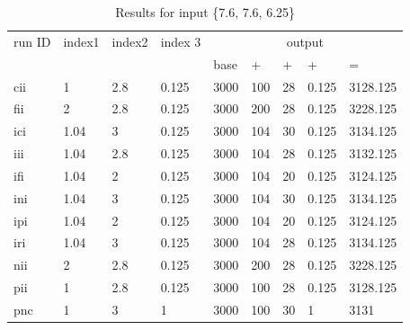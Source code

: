 \documentclass[11pt,fleqn]{report}
\begin{document}
\begin{table}[H]
\caption{Results for input \{7.6, 7.6, 6.25\}}
\begin{center}
\begin{tabular}{|l||l|l|l||llll|l|}
\hline
run ID & index1 & index2 & index 3 & \multicolumn{5}{c|}{output} \\
       &        &        &         & base &  +  & +  &   +   &   =      \\ \hline \hline
cii    & 1      & 2.8    & 0.125   & 3000 & 100 & 28 & 0.125 & 3128.125 \\ \hline
fii    & 2      & 2.8    & 0.125   & 3000 & 200 & 28 & 0.125 & 3228.125 \\ \hline
ici    & 1.04   & 3      & 0.125   & 3000 & 104 & 30 & 0.125 & 3134.125 \\ \hline
iii    & 1.04   & 2.8    & 0.125   & 3000 & 104 & 28 & 0.125 & 3132.125 \\ \hline
ifi    & 1.04   & 2      & 0.125   & 3000 & 104 & 20 & 0.125 & 3124.125 \\ \hline
ini    & 1.04   & 3      & 0.125   & 3000 & 104 & 30 & 0.125 & 3134.125 \\ \hline
ipi    & 1.04   & 2      & 0.125   & 3000 & 104 & 20 & 0.125 & 3124.125 \\ \hline
iri    & 1.04   & 3      & 0.125   & 3000 & 104 & 28 & 0.125 & 3134.125 \\ \hline
nii    & 2      & 2.8    & 0.125   & 3000 & 200 & 28 & 0.125 & 3228.125 \\ \hline
pii    & 1      & 2.8    & 0.125   & 3000 & 100 & 28 & 0.125 & 3128.125 \\ \hline
pnc    & 1      & 3      & 1       & 3000 & 100 & 30 & 1     & 3131     \\ \hline
\hline
\end{tabular}
\end{center}
\end{table}

\end{document}

